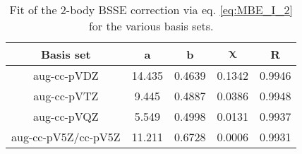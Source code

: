 \begin{table}[]
\centering
\begin{tabular}{@{}ccccc@{}}
\toprule
\textbf{Basis set}  & \textbf{a} & \textbf{b} & $\mathbf{\chi}$ & \textbf{R} \\
\hline
aug-cc-pVDZ         & 14.435 & 0.4639 & 0.1342 & 0.9946 \\
aug-cc-pVTZ         & 9.445  & 0.4887 & 0.0386 & 0.9948 \\
aug-cc-pVQZ         & 5.549  & 0.4998 & 0.0131 & 0.9937 \\
aug-cc-pV5Z/cc-pV5Z & 11.211 & 0.6728 & 0.0006 & 0.9931 \\ \bottomrule
\end{tabular}
\caption[Fit of the 2-body BSSE correction via eq. \eqref{eq:MBE_I_2} for the various basis sets.]{Fit of the 2-body BSSE correction via eq. \eqref{eq:MBE_I_2} for the various basis sets.}
\label{tab:MBE_I_T6}
\end{table}
